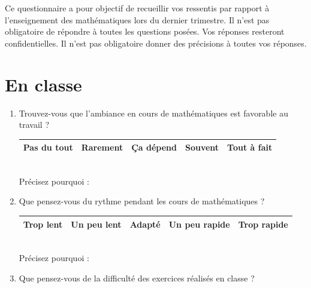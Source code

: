 \documentclass[oneside,12pt]{article}          %
\begin{document}
Ce questionnaire a pour objectif de recueillir vos ressentis par rapport à l'enseignement des mathématiques lors du dernier trimestre. Il n'est pas obligatoire de répondre à toutes les questions posées. Vos réponses resteront confidentielles. Il n'est pas obligatoire donner des précisions à toutes vos réponses.

\section{En classe}

\begin{enumerate}[itemsep=5mm]

	\item Trouvez-vous que l'ambiance en cours de mathématiques est favorable au travail ?
	
		\hspace{\linewidth-\textwidth}
		\renewcommand{\arraystretch}{1.5}
		\begin{tabular}{| P{0.175\textwidth} | P{0.175\textwidth} | P{0.175\textwidth} | P{0.175\textwidth} | P{0.175\textwidth} |} \hline
			Pas du tout & Rarement & Ça dépend & Souvent & Tout à fait \\ \hline
		\end{tabular} \\
		
		\hspace{\linewidth-\textwidth} Précisez pourquoi : 
		
		
		
	\item Que pensez-vous du rythme pendant les cours de mathématiques ?
	
		\hspace{\linewidth-\textwidth}
		\renewcommand{\arraystretch}{1.5}
		\begin{tabular}{| P{0.175\textwidth} | P{0.175\textwidth} | P{0.175\textwidth} | P{0.175\textwidth} |  P{0.175\textwidth} |} \hline
			Trop lent & Un peu lent & Adapté & Un peu rapide & Trop rapide \\ \hline
		\end{tabular}\\
		
		\hspace{\linewidth-\textwidth} Précisez pourquoi : 
		
		
		
	\item Que pensez-vous de la difficulté des exercices réalisés en classe ?
	

\end{enumerate}
\end{document}
